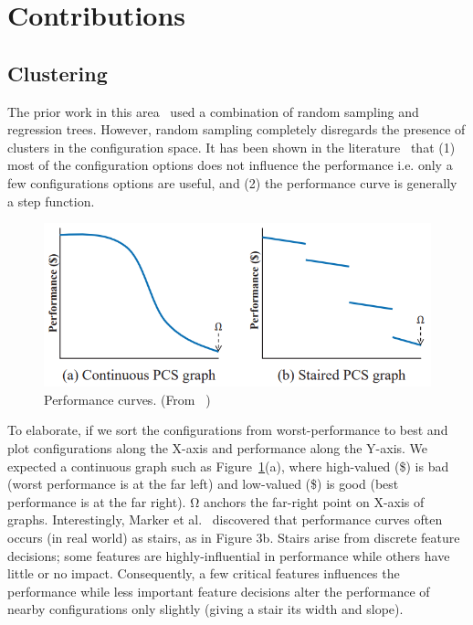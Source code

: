 \section{Contributions}

\subsection{Clustering}
The prior work in this area~\cite{guo2013variability, sarkar2015cost} used a combination of random sampling and regression trees. However, random sampling completely disregards the presence of clusters in the configuration space. It has been shown in the literature~\cite{oh2017finding} that (1) most of the configuration options does not influence the performance i.e. only a few configurations options are useful, and (2) the performance curve is generally a step function. 

\begin{figure}[!htbp]
    \centering
    \includegraphics[width=0.8\linewidth]{Chapter-Introduction/Figures/stairs.png}
    \caption{Performance curves. (From ~\cite{oh2017finding})}
    \label{fig:chap1_stairs}
\end{figure}

To elaborate, if we sort the configurations from worst-performance to best and
plot configurations along the X-axis and performance along the
Y-axis. We expected a continuous graph
such as Figure~\ref{fig:chap1_stairs}(a), where high-valued (\$) is bad (worst performance is at the far left) and low-valued (\$) is good (best performance is at the
far right). Ω anchors the far-right point on X-axis of graphs. Interestingly, Marker et al.~\cite{marker2014understanding} discovered that performance curves often occurs (in real world) as stairs, as in Figure 3b. Stairs arise from discrete feature decisions;
some features are highly-influential in performance while others
have little or no impact. Consequently, a few critical features
influences the performance while less important feature decisions alter the performance of nearby configurations only slightly (giving a stair its width and slope).

